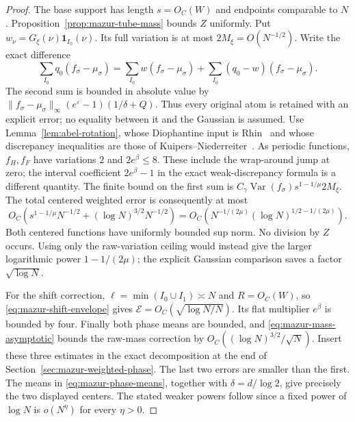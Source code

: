 \documentclass[11pt]{article}
\theoremstyle{remark}\newtheorem{remark}[proposition]{Remark}
\begin{document}
\begin{proof}
The base support has length $s=O_C(W)$ and endpoints comparable to
$N$. Proposition~\ref{prop:mazur-tube-mass} bounds $Z$ uniformly.
Put $w_\nu=G_\xi(\nu)\mathbf1_{I_0}(\nu)$. Its full variation
is at most $2M_\xi=O(N^{-1/2})$. Write the exact difference
\[
 \sum_{I_0}q_0(f_\sigma-\mu_\sigma)
 =\sum_{I_0}w(f_\sigma-\mu_\sigma)
       +\sum_{I_0}(q_0-w)(f_\sigma-\mu_\sigma).
\]
The second sum is bounded in absolute value by
$\|f_\sigma-\mu_\sigma\|_\infty(e^\varepsilon-1)(1/\delta+Q)$.
Thus every original atom is retained with an explicit error;
no equality between it and the Gaussian is assumed.
Use Lemma~\ref{lem:abel-rotation}, whose Diophantine input is
Rhin~\cite[p.~160, (8)]{Rhin1987} and whose discrepancy inequalities
are those of Kuipers--Niederreiter~\cite[Ch.~2]{KN1974}.
As periodic functions, $f_H,f_F$ have variations $2$ and
$2e^\beta\le8$. These include the wrap-around jump at zero;
the interval coefficient $2e^\beta-1$ in the exact weak-discrepancy
formula is a different quantity. The finite bound on the first sum
is $C_\gamma\operatorname{Var}(f_\sigma)s^{1-1/\mu}2M_\xi$.
The total centered weighted error is consequently at most
\[
 O_C\!\left(s^{1-1/\mu}N^{-1/2}
                     +(\log N)^{3/2}N^{-1/2}\right)
 =O_C\!\left(N^{-1/(2\mu)}
                   (\log N)^{1/2-1/(2\mu)}\right).
\]
Both centered functions have uniformly bounded sup norm.
No division by $Z$ occurs. Using only the raw-variation ceiling
would instead give the larger logarithmic power $1-1/(2\mu)$;
the explicit Gaussian comparison saves a factor $\sqrt{\log N}$.

For the shift correction, $\ell=\min(I_0\cup I_1)\asymp N$ and
$R=O_C(W)$, so \eqref{eq:mazur-shift-envelope} gives
$\mathcal E=O_C(\sqrt{\log N/N})$. Its flat multiplier $e^\beta$
is bounded by four. Finally both phase means are bounded, and
\eqref{eq:mazur-mass-asymptotic} bounds the raw-mass correction
by $O_C((\log N)^{3/2}/\sqrt N)$.
Insert these three estimates in the exact decomposition at the end
of Section~\ref{sec:mazur-weighted-phase}. The last two errors are
smaller than the first. The means in
\eqref{eq:mazur-phase-means}, together with $\delta=d/\log2$,
give precisely the two displayed centers. The stated weaker powers
follow since a fixed power of $\log N$ is $o(N^\eta)$ for every
$\eta>0$.
\end{proof}
\end{document}
